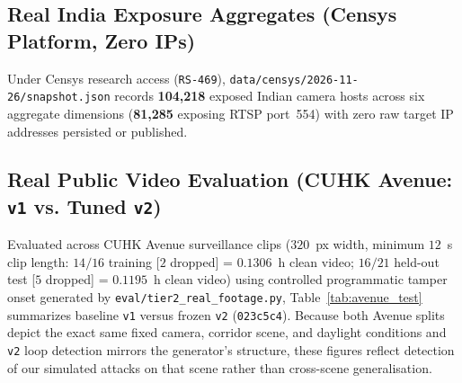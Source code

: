 \documentclass[12pt,a4paper]{article}
\begin{document}
\subsection{Real India Exposure Aggregates (Censys Platform, Zero IPs)}
Under Censys research access (\texttt{RS-469}), \texttt{data/censys/2026-11-26/snapshot.json} records \textbf{104,218} exposed Indian camera hosts across six aggregate dimensions (\textbf{81,285} exposing RTSP port~554) with zero raw target IP addresses persisted or published.

\subsection{Real Public Video Evaluation (CUHK Avenue: \texttt{v1} vs. Tuned \texttt{v2})}
Evaluated across CUHK Avenue surveillance clips ($320$~px width, minimum $12$~s clip length: $14/16$ training [$2$ dropped] = $0.1306$~h clean video; $16/21$ held-out test [$5$ dropped] = $0.1195$~h clean video) using controlled programmatic tamper onset generated by \texttt{eval/tier2\_real\_footage.py}, Table~\ref{tab:avenue_test} summarizes baseline \texttt{v1} versus frozen \texttt{v2} (\texttt{023c5c4}). Because both Avenue splits depict the exact same fixed camera, corridor scene, and daylight conditions and \texttt{v2} loop detection mirrors the generator's structure, these figures reflect detection of our simulated attacks on that scene rather than cross-scene generalisation.
\end{document}
